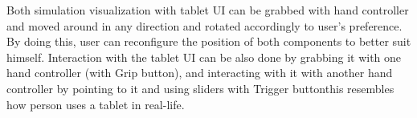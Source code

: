 Both simulation visualization with tablet UI can be grabbed with hand controller and moved around in any direction and rotated accordingly to user's preference. By doing this, user can reconfigure the position of both components to better suit himself. Interaction with the tablet UI can be also done by grabbing it with one hand controller (with Grip button), and interacting with it with another hand controller by pointing to it and using sliders with Trigger button\textemdash this resembles how person uses a tablet in real-life.
